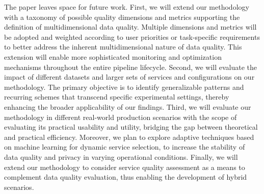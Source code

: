 \documentclass[sn-mathphys-num,referee]{sn-jnl}
\theoremstyle{definition}
\begin{document}
The paper leaves space for future work. First, we will extend our methodology with a taxonomy of possible quality dimensions and metrics supporting the definition of multidimensional data quality. Multiple dimensions and metrics will be adopted and weighted according to user priorities or task-specific requirements to better address the inherent multidimensional nature of data quality. This extension will enable more sophisticated monitoring and optimization mechanisms throughout the entire pipeline lifecycle. Second, we will evaluate the impact of different datasets and larger sets of services and configurations on our methodology. The primary objective is to identify generalizable patterns and recurring schemes that transcend specific experimental settings, thereby enhancing the broader applicability of our findings. Third, we will evaluate our methodology in different real-world production scenarios with the scope of evaluating its practical usability and utility, bridging the gap between theoretical and practical efficiency. Moreover, we plan to explore adaptive techniques based on machine learning for dynamic service selection, to increase the stability of data quality and privacy in varying operational conditions. Finally, we will extend our methodology to consider service quality assessment as a means to complement data quality evaluation, thus enabling the development of hybrid scenarios.



\clearpage

\end{document}

